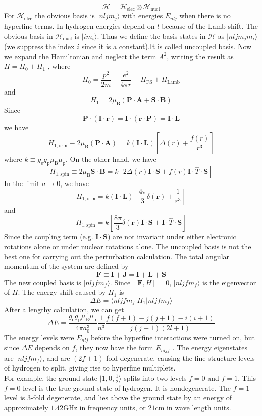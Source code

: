 \documentclass[cyan]{elegantnote}
\begin{document}
\[\mathcal{H} = \mathcal{H}_{\mathrm{elec}} \otimes \mathcal{H}_{\mathrm{nucl}}\]
For $\mathcal{H}_{\mathrm{elec}}$ the obvious basis is $|nljm_j\rangle$ with energies $E_{nlj}$ when there is no hyperfine terms. In hydrogen energies depend on $l$ because of the Lamb shift. The obvious basis in $\mathcal{H}_{\mathrm{nucl}}$ is $|im_i\rangle$. Thus we define the basis states in $\mathcal{H}$ as $|nljm_jm_i\rangle$ (we suppress the index $i$ since it is a constant).It is called uncoupled basis. Now we expand the Hamiltonian and neglect the term $A^2$, writing the result as $H = H_0 + H_1$ , where
\[H_0 = \frac{p^2}{2m} - \frac{e^2}{4\pi r}  + H_{\mathrm{FS}} + H_{\mathrm{Lamb}}\]
and
\[H_1 = 2\mu_{\mathrm{B}}(\bm{P}\cdot\bm{A} + \bm{S}\cdot\bm{B})\]
Since
\[\bm{P}\cdot(\bm{I}\cdot\bm{r}) = \bm{I}\cdot(\bm{r}\cdot\bm{P}) = \bm{I}\cdot\bm{L}\]
we have
\[H_{1,\mathrm{orbi}} \equiv 2\mu_{\mathrm{B}}(\bm{P}\cdot\bm{A}) = k(\bm{I}\cdot\bm{L}) \left[\Delta(r) + \frac{f(r)}{r^3}\right ]\]
where $k \equiv g_{\mathrm{e}}g_{\mathrm{p}}\mu_{\mathrm{B}}\mu_{\mathrm{p}}$.
On the other hand, we have
\[H_{1,\mathrm{spin}} \equiv 2\mu_{\mathrm{B}} \bm{S}\cdot\bm{B} = k\left [2\Delta(r)\bm{I}\cdot\bm{S} + f(r)\bm{I}\cdot\hat{T}\cdot\bm{S}\right ] \]
In the limit $a \to 0$, we have
\[H_{1,\mathrm{orbi}} = k(\bm{I}\cdot\bm{L}) \left[\frac{4\pi}{3}\delta(\bm{r}) + \frac{1}{r^3}\right ]\]
and
\[H_{1,\mathrm{spin}}  = k\left [\frac{8\pi}{3}\delta(\bm{r})\bm{I}\cdot\bm{S} + \bm{I}\cdot\hat{T}\cdot\bm{S}\right ] \]
Since the coupling term (e.g. $\bm{I}\cdot\bm{S}$) are not invariant under either electronic rotations alone or under nuclear rotations alone. The uncoupled basis is not the best one for carrying out the perturbation calculation. The total angular momentum of the system are defined by
\[\bm{F} \equiv \bm{I} + \bm{J} = \bm{I} + \bm{L} + \bm{S}\]
The new coupled basis is $|nljfm_f\rangle$. Since $[\bm{F},H] = 0$, $|nljfm_f\rangle$ is the eigenvector of $H$. The energy shift caused by $H_1$ is
\[\Delta E = \langle nljfm_f | H_1 | nljfm_f\rangle\]
After a lengthy calculation, we can get
\[\Delta E = \frac{g_{\mathrm{e}}g_{\mathrm{p}}\mu_{\mathrm{B}}\mu_{\mathrm{p}}}{4\pi a_0^3} \frac{1}{n^3} \frac{f(f+1)-j(j+1)-i(i+1)}{j(j+1)(2l+1)} \]
The energy levels were $E_{nlj}$ before the hyperfine interactions were turned on, but since $\Delta E$ depends on $f$, they now have the form $E_{nljf}$ . The energy eigenstates are $|nljfm_f\rangle$, and are $(2f+1)$-fold degenerate, causing the fine structure levels of hydrogen to split, giving rise to hyperfine multiplets. \\
For example, the ground state $|1,0,\frac{1}{2}\rangle$ splits into two levels $f = 0$ and $f = 1$. This $f = 0$ level is the true ground state of hydrogen. It is nondegenerate. The $f=1$ level is 3-fold degenerate, and lies above the ground state by an energy of approximately $1.42 \mathrm{GHz}$ in frequency
units, or $21 \mathrm{cm}$ in wave length units.
\end{document}
